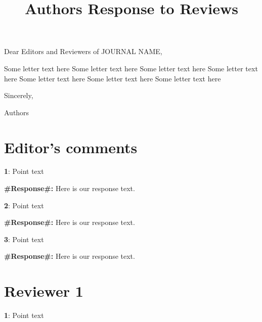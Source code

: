 \documentclass{article}
\title{Authors Response to Reviews}
\author{}
\date{\begin{flushright}\today\end{flushright}}
\begin{document}
\maketitle

\section*{}
Dear Editors and Reviewers of JOURNAL NAME,

\begin{flushleft}
Some letter text here
Some letter text here
Some letter text here
Some letter text here
Some letter text here
Some letter text here
Some letter text here
\end{flushleft}

\begin{center}
Sincerely,

Authors
\end{center}

\section*{Editor's comments}

\begin{flushleft}
\textbf{1}: Point text
\end{flushleft}

\begin{flushleft}
\textbf{\#Response\#:} 
Here is our response text.
\end{flushleft}

\begin{flushleft}
\textbf{2}: Point text
\end{flushleft}

\begin{flushleft}
\textbf{\#Response\#:} 
Here is our response text.
\end{flushleft}

\begin{flushleft}
\textbf{3}: Point text
\end{flushleft}

\begin{flushleft}
\textbf{\#Response\#:} 
Here is our response text.
\end{flushleft}

\section*{Reviewer 1}

\begin{flushleft}
\textbf{1}: Point text
\end{flushleft}
\end{document}
